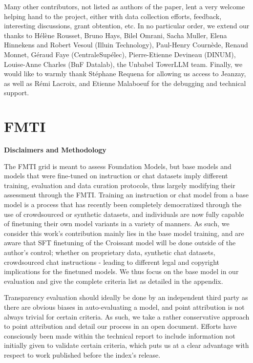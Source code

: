 Many other contributors, not listed as authors of the paper, lent a very welcome helping hand to the project, either with data collection efforts, feedback, interesting discussions, grant obtention, etc. In no particular order, we extend our thanks to Hélène Rousset, Bruno Hays, Bilel Omrani, Sacha Muller, Elena Hinnekens and Robert Vesoul (Illuin Technology), Paul-Henry Cournède, Renaud Monnet, Géraud Faye (CentraleSupélec), Pierre-Etienne Devineau (DINUM),  Louise-Anne Charles (BnF Datalab), the Unbabel TowerLLM team.
Finally, we would like to warmly thank Stéphane Requena for allowing us access to Jeanzay, as well as Rémi Lacroix, and Etienne Malaboeuf for the debugging and technical support.

\section{FMTI}

\textbf{Disclaimers and Methodology} 

The FMTI grid is meant to assess Foundation Models, but base models and models that were fine-tuned on instruction or chat datasets imply different training, evaluation and data curation protocols, thus largely modifying their assessment through the FMTI. Training an instruction or chat model from a base model is a process that has recently been completely democratized through the use of crowdsourced or synthetic datasets, and individuals are now fully capable of finetuning their own model variants in a variety of manners. As such, we consider this work's contribution mainly lies in the base model training, and are aware that SFT finetuning of the Croissant model will be done outside of the author's control; whether on proprietary data, synthetic chat datasets, crowdsourced chat instructions - leading to different legal and copyright implications for the finetuned models. We thus focus on the base model in our evaluation and give the complete criteria list as detailed in the appendix. 

Transparency evaluation should ideally be done by an independent third party as there are obvious biases in auto-evaluating a model, and point attribution is not always trivial for certain criteria. As such, we take a rather conservative approach to point attribution and detail our process in an open document. Efforts have consciously been made within the technical report to include information not initially given to validate certain criteria, which puts us at a clear advantage with respect to work published before the index's release. 

